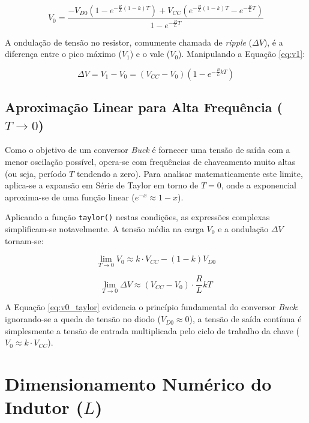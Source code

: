 \begin{equation}
	V_0 = \frac{-V_{D0} \left(1 - e^{-\frac{R}{L}(1-k)T}\right) + V_{CC} \left(e^{-\frac{R}{L}(1-k)T} - e^{-\frac{R}{L}T}\right)}{1 - e^{-\frac{R}{L}T}}
\end{equation}

A ondulação de tensão no resistor, comumente chamada de \textit{ripple} ($\Delta V$), é a diferença entre o pico máximo ($V_1$) e o vale ($V_0$). Manipulando a Equação \ref{eq:v1}:

\begin{equation}
	\Delta V = V_1 - V_0 = (V_{CC} - V_0) \left( 1 - e^{-\frac{R}{L}kT} \right)
\end{equation}

\subsection{Aproximação Linear para Alta Frequência ($T \to 0$)}

Como o objetivo de um conversor \textit{Buck} é fornecer uma tensão de saída com a menor oscilação possível, opera-se com frequências de chaveamento muito altas (ou seja, período $T$ tendendo a zero). Para analisar matematicamente este limite, aplica-se a expansão em Série de Taylor em torno de $T=0$, onde a exponencial aproxima-se de uma função linear ($e^{-x} \approx 1 - x$).

Aplicando a função \texttt{taylor()} nestas condições, as expressões complexas simplificam-se notavelmente. A tensão média na carga $V_0$ e a ondulação $\Delta V$ tornam-se:

\begin{equation}
	\lim_{T \to 0} V_0 \approx k \cdot V_{CC} - (1-k)V_{D0}
	\label{eq:v0_taylor}
\end{equation}

\begin{equation}
	\lim_{T \to 0} \Delta V \approx (V_{CC} - V_0) \cdot \frac{R}{L} k T
	\label{eq:deltav_taylor}
\end{equation}

A Equação \ref{eq:v0_taylor} evidencia o princípio fundamental do conversor \textit{Buck}: ignorando-se a queda de tensão no diodo ($V_{D0} \approx 0$), a tensão de saída contínua é simplesmente a tensão de entrada multiplicada pelo ciclo de trabalho da chave ($V_0 \approx k \cdot V_{CC}$).

\section{Dimensionamento Numérico do Indutor ($L$)}

